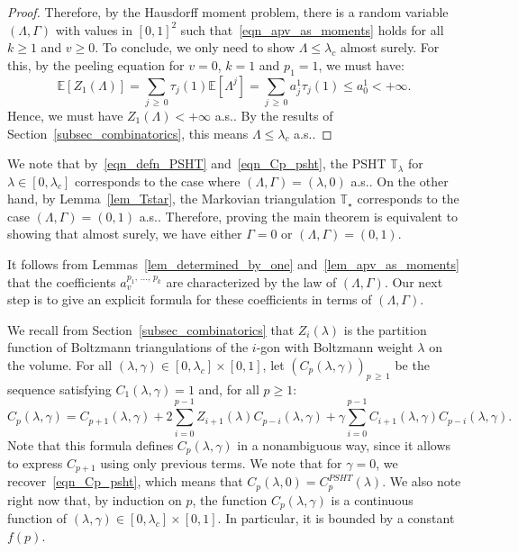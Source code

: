 \documentclass[10pt]{amsart}
\theoremstyle{definition}\newtheorem{defi}[theo]{Definition}\newtheorem{rema}[theo]{Remark}\newtheorem{exam}[theo]{Example}\newtheorem{exem}[theo]{Example}\newtheorem{nota}[theo]{Notation}
\newcommand{\TT}{\mathbb{T}}
\newcommand{\E}{\mathbb{E}}
\begin{document}
\begin{proof}
Therefore, by the Hausdorff moment problem, there is a random variable $(\Lambda, \Gamma)$ with values in $[0,1]^2$ such that~\eqref{eqn_apv_as_moments} holds for all $k \geq 1$ and $v \geq 0$. To conclude, we only need to show $\Lambda \leq \lambda_c$ almost surely. For this, by the peeling equation for $v=0$, $k=1$ and $p_1=1$, we must have:
\[
\E \left[Z_1(\Lambda) \right] = \sum_{j\,\geq\,0} \tau_j(1) \E \left[\Lambda^j \right] = \sum_{j\, \geq\,0} a^1_{j} \tau_j(1) \leq a_0^1 < +\infty.
\]
Hence, we must have $Z_1(\Lambda) <+\infty$ a.s.. By the results of Section~\ref{subsec_combinatorics}, this means $\Lambda \leq \lambda_c$ a.s..
\end{proof}

We note that by~\eqref{eqn_defn_PSHT} and~\eqref{eqn_Cp_psht}, the PSHT $\TT_{\lambda}$ for $\lambda \in [0,\lambda_c]$ corresponds to the case where $(\Lambda,\Gamma)=(\lambda,0)$ a.s.. On the other hand, by Lemma~\ref{lem_Tstar}, the Markovian triangulation $\TT_{\star}$ corresponds to the case $(\Lambda,\Gamma)=(0,1)$ a.s.. Therefore, proving the main theorem is equivalent to showing that almost surely, we have either $\Gamma=0$ or $(\Lambda,\Gamma)=(0,1)$.

It follows from Lemmas~\ref{lem_determined_by_one} and~\ref{lem_apv_as_moments} that the coefficients $a_v^{p_1,\,\dots,\,p_k}$ are characterized by the law of $(\Lambda, \Gamma)$. Our next step is to give an explicit formula for these coefficients in terms of $(\Lambda, \Gamma)$.

We recall from Section~\ref{subsec_combinatorics} that $Z_i(\lambda)$ is the partition function of Boltzmann triangulations of the $i$-gon with Boltzmann weight $\lambda$ on the volume. For all $(\lambda, \gamma) \in [0,\lambda_c] \times [0,1]$, let $(C_p(\lambda,\gamma))_{p\,\geq\,1}$ be the sequence satisfying $C_1(\lambda,\gamma)=1$ and, for all $p \geq 1$:
\begin{equation}\label{eqn_peeling_Cp}
C_p(\lambda,\gamma) = C_{p+1}(\lambda,\gamma) + 2 \sum_{i=0}^{p-1} Z_{i+1}(\lambda) C_{p-i}(\lambda,\gamma) + \gamma \sum_{i=0}^{p-1} C_{i+1}(\lambda, \gamma) C_{p-i}(\lambda, \gamma).
\end{equation}
Note that this formula defines $C_p(\lambda, \gamma)$ in a nonambiguous way, since it allows to express $C_{p+1}$ using only previous terms. We note that for $\gamma=0$, we recover~\eqref{eqn_Cp_psht}, which means that $C_p(\lambda,0)=C_p^{PSHT}(\lambda)$. We also note right now that, by induction on $p$, the function $C_p(\lambda, \gamma)$ is a continuous function of $(\lambda, \gamma) \in [0,\lambda_c] \times [0,1]$. In particular, it is bounded by a constant $f(p)$.
\end{document}
